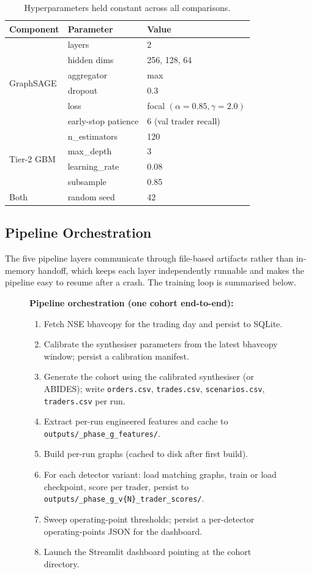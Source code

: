 \documentclass[10pt,twocolumn,letterpaper]{article}
\begin{document}
\begin{table}[t]
\caption{Hyperparameters held constant across all comparisons.}
\label{tab:hparams}
\centering
\footnotesize
\begin{tabular}{lll}
\toprule
Component & Parameter & Value \\
\midrule
\multirow{6}{*}{GraphSAGE} & layers & 2 \\
 & hidden dims & 256, 128, 64 \\
 & aggregator & max \\
 & dropout & 0.3 \\
 & loss & focal $(\alpha{=}0.85,\gamma{=}2.0)$ \\
 & early-stop patience & 6 (val trader recall) \\
\midrule
\multirow{4}{*}{Tier-2 GBM} & n\_estimators & 120 \\
 & max\_depth & 3 \\
 & learning\_rate & 0.08 \\
 & subsample & 0.85 \\
\midrule
Both & random seed & 42 \\
\bottomrule
\end{tabular}
\end{table}

\subsection{Pipeline Orchestration}
\label{sec:orch}
The five pipeline layers communicate through file-based artifacts
rather than in-memory handoff, which keeps each layer independently
runnable and makes the pipeline easy to resume after a crash.
The training loop is summarised below.

\begin{figure}[t]
\small
\noindent\textbf{Pipeline orchestration (one cohort end-to-end):}
\begin{enumerate}
\item Fetch NSE bhavcopy for the trading day and persist to SQLite.
\item Calibrate the synthesiser parameters from the latest bhavcopy
window; persist a calibration manifest.
\item Generate the cohort using the calibrated synthesiser (or ABIDES);
write \texttt{orders.csv}, \texttt{trades.csv}, \texttt{scenarios.csv},
\texttt{traders.csv} per run.
\item Extract per-run engineered features and cache to
\texttt{outputs/\_phase\_g\_features/}.
\item Build per-run graphs (cached to disk after first build).
\item For each detector variant: load matching graphs, train or load
checkpoint, score per trader, persist to
\texttt{outputs/\_phase\_g\_v\{N\}\_trader\_scores/}.
\item Sweep operating-point thresholds; persist a per-detector
operating-points JSON for the dashboard.
\item Launch the Streamlit dashboard pointing at the cohort directory.
\end{enumerate}
\end{figure}
\end{document}
